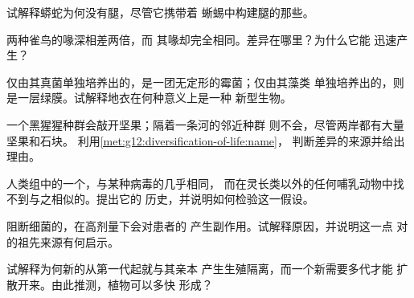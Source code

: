 \begin{exercise}[$\star\star$]\label{exo:g12:diversification-of-life:8}
试解释蟒蛇为何没有腿，尽管它携带着
蜥蜴中构建腿的那些。
\end{exercise}

\begin{exercise}[$\star\star$]\label{exo:g12:diversification-of-life:9}
两种雀鸟的喙深相差两倍，而
其喙却完全相同。差异在哪里？为什么它能
迅速产生？
\end{exercise}

\begin{exercise}[$\star\star$]\label{exo:g12:diversification-of-life:10}
仅由其真菌单独培养出的，是一团无定形的霉菌；仅由其藻类
单独培养出的，则是一层绿膜。试解释地衣在何种意义上是一种
新型生物。
\end{exercise}

\begin{exercise}[$\star\star$]\label{exo:g12:diversification-of-life:11}
一个黑猩猩种群会敲开坚果；隔着一条河的邻近种群
则不会，尽管两岸都有大量坚果和石块。
利用\cref{met:g12:diversification-of-life:name}，
判断差异的来源并给出理由。
\end{exercise}

\begin{exercise}[$\star\star\star$]\label{exo:g12:diversification-of-life:12}
人类组中的一个，与某种病毒的几乎相同，
而在灵长类以外的任何哺乳动物中找不到与之相似的。提出它的
历史，并说明如何检验这一假设。
\end{exercise}

\begin{exercise}[$\star\star\star$]\label{exo:g12:diversification-of-life:13}
阻断细菌的，在高剂量下会对患者的
产生副作用。试解释原因，并说明这一点
对的祖先来源有何启示。
\end{exercise}

\begin{exercise}[$\star\star\star$]\label{exo:g12:diversification-of-life:14}
试解释为何新的从第一代起就与其亲本
产生生殖隔离，而一个新需要多代才能
扩散开来。由此推测，植物可以多快
形成？
\end{exercise}

